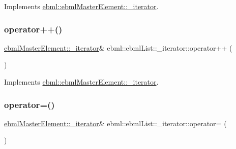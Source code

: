Implements \mbox{\hyperlink{classebml_1_1ebmlMasterElement_1_1__iterator_a3275ab5cdba37d79dd323879598f4f5d}{ebml\+::ebml\+Master\+Element\+::\+\_\+iterator}}.

\mbox{\label{classebml_1_1ebmlList_1_1__iterator_a48ccc42627bfcc8b681126603232f587}} 
\subsubsection{\texorpdfstring{operator++()}{operator++()}}
{\footnotesize\ttfamily \mbox{\hyperlink{classebml_1_1ebmlMasterElement_1_1__iterator}{ebml\+Master\+Element\+::\+\_\+iterator}}\& ebml\+::ebml\+List\+::\+\_\+iterator\+::operator++ (\begin{DoxyParamCaption}{ }\end{DoxyParamCaption})\hspace{0.3cm}{\ttfamily [virtual]}}



Implements \mbox{\hyperlink{classebml_1_1ebmlMasterElement_1_1__iterator_ab77210fd0e481e1bb5b8563f7bd8142b}{ebml\+::ebml\+Master\+Element\+::\+\_\+iterator}}.

\mbox{\label{classebml_1_1ebmlList_1_1__iterator_a76134ca4a1212fcf2083fb5f3f6e7130}} 
\subsubsection{\texorpdfstring{operator=()}{operator=()}}
{\footnotesize\ttfamily \mbox{\hyperlink{classebml_1_1ebmlMasterElement_1_1__iterator}{ebml\+Master\+Element\+::\+\_\+iterator}}\& ebml\+::ebml\+List\+::\+\_\+iterator\+::operator= (\begin{DoxyParamCaption}\item[{const \mbox{\hyperlink{classebml_1_1ebmlMasterElement_1_1__iterator}{ebml\+Master\+Element\+::\+\_\+iterator}} \&}]{ }\end{DoxyParamCaption})\hspace{0.3cm}{\ttfamily [virtual]}}



